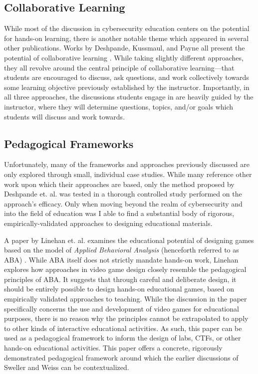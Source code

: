 \documentclass{article}
\begin{document}
\subsection{Collaborative Learning}

    While most of the discussion in cybersecurity education centers on the potential for hands-on learning, there is another notable theme which appeared in several other publications. 
    Works by Deshpande, Kussmaul, and Payne all present the potential of collaborative learning \cite{P-Deshpande,C-Kussmaul,B-Payne}. 
    While taking slightly different approaches, they all revolve around the central principle of collaborative learning---that students are encouraged to discuss, ask questions, and work collectively towards some learning objective previously established by the instructor. 
    Importantly, in all three approaches, the discussions students engage in are heavily guided by the instructor, where they will determine questions, topics, and/or goals which students will discuss and work towards. 

\subsection{Pedagogical Frameworks}

    Unfortunately, many of the frameworks and approaches previously discussed are only explored through small, individual case studies. 
    While many reference other work upon which their approaches are based, only the method proposed by Deshpande et. al. was tested in a thorough controlled study performed on the approach’s efficacy. 
    Only when moving beyond the realm of cybersecurity and into the field of education was I able to find a substantial body of rigorous, empirically-validated approaches to designing educational materials. 

    A paper by Linehan et. al. examines the educational potential of designing games based on the model of \emph{Applied Behavioral Analysis} (henceforth referred to as ABA) \cite{C-Linehan}. 
    While ABA itself does not strictly mandate hands-on work, Linehan explores how approaches in video game design closely resemble the pedagogical principles of ABA. 
    It suggests that through careful and deliberate design, it should be entirely possible to design hands-on educational games, based on empirically validated approaches to teaching. 
    While the discussion in the paper specifically concerns the use and development of video games for educational purposes, there is no reason why the principles cannot be extrapolated to apply to other kinds of interactive educational activities. 
    As such, this paper can be used as a pedagogical framework to inform the design of labs, CTFs, or other hands-on educational activities. 
    This paper offers a concrete, rigorously demonstrated pedagogical framework around which the earlier discussions of Sweller and Weiss can be contextualized. 
\end{document}
